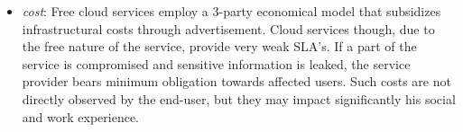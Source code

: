 \begin{itemize}
\item {\it cost}: Free cloud services employ a 3-party economical model that
      subsidizes infrastructural costs through advertisement. Cloud services
      though, due to the free nature of the service, provide very weak SLA's. If
      a part of the service is compromised and sensitive information is leaked,
      the service provider bears minimum obligation towards affected users. Such
      costs are not directly observed by the end-user, but they may impact
      significantly his social and work experience. 


\end{itemize}
